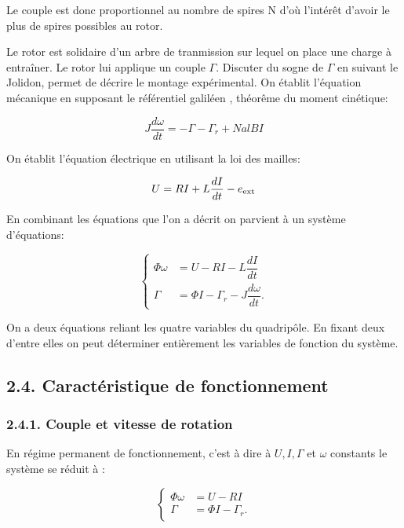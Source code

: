 \documentclass[french, a4paper, 10pt, twocolumn, landscape]{article}
\begin{document}
Le couple est donc proportionnel au nombre de spires N d'où l'intérêt d'avoir le plus de spires possibles au rotor.\medskip

Le rotor est solidaire d'un arbre de tranmission sur lequel on place une charge à entraîner. Le rotor lui applique un couple $\Gamma$. Discuter du sogne de $\Gamma$ en suivant le Jolidon, permet de décrire le montage expérimental. On établit l'équation mécanique en supposant le référentiel galiléen , théorême du moment cinétique: 

\begin{equation}
	J\dfrac{d\omega}{dt}=-\Gamma-\Gamma_r+NalBI
\end{equation}

On établit l'équation électrique en utilisant la loi des mailles:

\begin{equation}
	U = RI+L\dfrac{dI}{dt}-e_{\rm ext}
\end{equation}

En combinant les équations que l'on a décrit on parvient à un système d'équations:

\begin{equation}
	\left\{
		\begin{array}{cc}
		\Phi\omega & = U-RI-L\dfrac{dI}{dt}\\
		\Gamma & = \Phi I-\Gamma_r-J\dfrac{d\omega}{dt}.
	\end{array}
	\right.
\end{equation}

On a deux équations reliant les quatre variables du quadripôle. En fixant deux d'entre elles on peut déterminer entièrement les variables de fonction du système.

\subsection*{2.4. Caractéristique de fonctionnement}

\subsubsection*{2.4.1. Couple et vitesse de rotation}

En régime permanent de fonctionnement, c'est à dire à $U, I, \Gamma$ et $\omega$ constants le système se réduit à : 

\begin{equation}
	\left\{
		\begin{array}{cc}
		\Phi\omega & = U-RI\\
		\Gamma & = \Phi I-\Gamma_r.
	\end{array}
	\right.
\end{equation}
\end{document}
